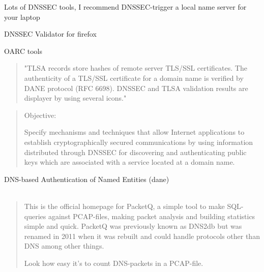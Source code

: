 \documentclass[20pt,landscape,a4paper,footrule]{foils}
\begin{document}


Lots of DNSSEC tools, I recommend DNSSEC-trigger a local name server for your laptop

\begin{list2}
\item DNSSEC Validator for firefox\\ 
\item OARC tools 
\item {}
\end{list2}



\begin{quote}
"TLSA records store hashes of remote server TLS/SSL certificates. The authenticity of a TLS/SSL certificate for a domain name is verified by DANE protocol (RFC 6698). DNSSEC and TLSA validation results are displayer by using several icons." 
\end{quote}



\begin{quote}
Objective:

Specify mechanisms and techniques that allow Internet applications to
establish cryptographically secured communications by using information
distributed through DNSSEC for discovering and authenticating public 
keys which are associated with a service located at a domain name.
\end{quote}

DNS-based Authentication of Named Entities (dane)\\
\\
{\footnotesize {}}


\begin{quote}
This is the official homepage for PacketQ, a simple tool to make SQL-queries against PCAP-files, making packet analysis and building statistics simple and quick. PacketQ was previously known as DNS2db but was renamed in 2011 when it was rebuilt and could handle protocols other than DNS among other things.

Look how easy it's to count DNS-packets in a PCAP-file.
\end{quote}
\end{document}
